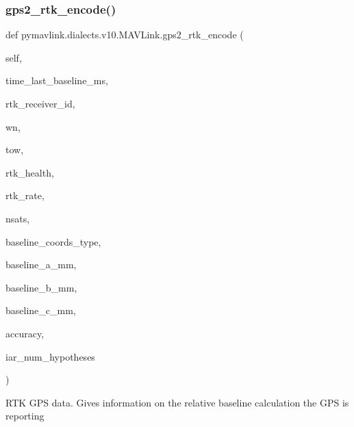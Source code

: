 \begin{DoxyVerb}
\begin{DoxyVerb}
\subsubsection{\texorpdfstring{gps2\+\_\+rtk\+\_\+encode()}{gps2\_rtk\_encode()}}
{\footnotesize\ttfamily def pymavlink.\+dialects.\+v10.\+M\+A\+V\+Link.\+gps2\+\_\+rtk\+\_\+encode (\begin{DoxyParamCaption}\item[{}]{self,  }\item[{}]{time\+\_\+last\+\_\+baseline\+\_\+ms,  }\item[{}]{rtk\+\_\+receiver\+\_\+id,  }\item[{}]{wn,  }\item[{}]{tow,  }\item[{}]{rtk\+\_\+health,  }\item[{}]{rtk\+\_\+rate,  }\item[{}]{nsats,  }\item[{}]{baseline\+\_\+coords\+\_\+type,  }\item[{}]{baseline\+\_\+a\+\_\+mm,  }\item[{}]{baseline\+\_\+b\+\_\+mm,  }\item[{}]{baseline\+\_\+c\+\_\+mm,  }\item[{}]{accuracy,  }\item[{}]{iar\+\_\+num\+\_\+hypotheses }\end{DoxyParamCaption})}

\begin{DoxyVerb}RTK GPS data. Gives information on the relative baseline calculation
the GPS is reporting


\end{DoxyVerb}
\end{DoxyVerb}
\end{DoxyVerb}

